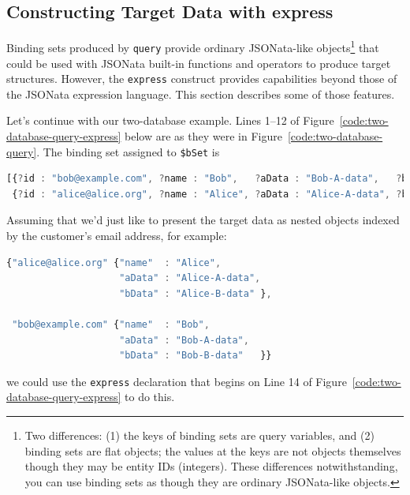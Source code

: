 \documentclass[9pt,letterpaper]{article}
\newcommand{\stt}[1]{\texttt{#1}} %
\begin{document}
\subsection{Constructing  Target Data with express}

Binding sets produced by \stt{query} provide ordinary JSONata-like objects\footnote{Two differences: (1) the keys of binding sets are query variables, and (2) binding sets are flat objects; the values at the keys are not objects themselves though they may be entity IDs (integers). These differences notwithstanding, you can use binding sets as though they are ordinary JSONata-like objects.} that could be used with JSONata built-in functions and operators to produce target structures.
However, the \stt{express} construct provides capabilities beyond those of the JSONata expression language.
This section describes some of those features.

Let's continue with our two-database example.
Lines 1--12 of Figure~\ref{code:two-database-query-express} below are as they were in Figure~\ref{code:two-database-query}.
The binding set assigned to \stt{\$bSet} is
\begin{lstlisting}[language=JavaScript,numbers=none,basicstyle=\ttfamily\scriptsize]
[{?id : "bob@example.com", ?name : "Bob",   ?aData : "Bob-A-data",   ?bData : "Bob-B-data"  },
 {?id : "alice@alice.org", ?name : "Alice", ?aData : "Alice-A-data", ?bData : "Alice-B-data"}].
\end{lstlisting} \vspace{-2em}

Assuming that we'd just like to present the target data as nested objects indexed by the customer's email address, for example:

\begin{lstlisting}[language=JavaScript,numbers=none,basicstyle=\ttfamily\scriptsize]
{"alice@alice.org" {"name"  : "Alice",
                    "aData" : "Alice-A-data",
                    "bData" : "Alice-B-data" },

 "bob@example.com" {"name"  : "Bob",
                    "aData" : "Bob-A-data",
                    "bData" : "Bob-B-data"   }}
\end{lstlisting} \vspace{-2em}

\hspace{-2em} we could use the \stt{express} declaration that begins on Line 14 of Figure~\ref{code:two-database-query-express} to do this.
\end{document}
